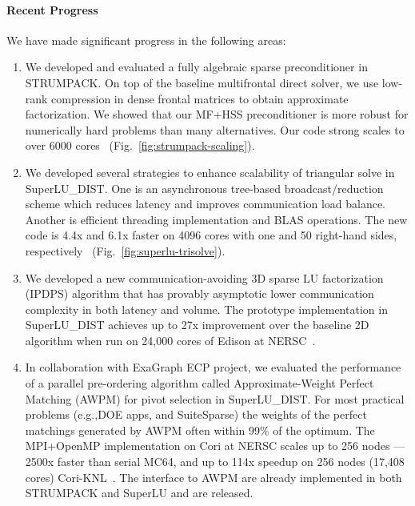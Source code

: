 \paragraph{Recent Progress}
We have made significant progress in the following areas:
\begin{enumerate}
\item We developed and evaluated a fully algebraic sparse preconditioner in 
      STRUMPACK. On top of the baseline multifrontal direct solver, we use
      low-rank compression in dense frontal matrices to obtain approximate
      factorization. We showed that our MF+HSS preconditioner is more robust
      for numerically hard problems than many alternatives. Our code
      strong scales to over 6000 cores~\cite{ghysels2017-ipdps}
      (Fig.~\ref{fig:strumpack-scaling}).
\item We developed several strategies to enhance scalability of triangular
      solve in SuperLU\_DIST. One is an asynchronous tree-based 
      broadcast/reduction scheme which reduces latency and improves
      communication load balance. Another is efficient threading implementation
      and BLAS operations. The new code is 4.4x and 6.1x faster on 4096 cores
      with one and 50 right-hand sides, respectively~\cite{LiuTriSolve2018}
      (Fig.~\ref{fig:superlu-trisolve}).
\item We developed a new communication-avoiding 3D sparse LU factorization
      (IPDPS) algorithm that has provably asymptotic lower communication
      complexity in both latency and volume. The prototype implementation
      in SuperLU\_DIST achieves up to 27x improvement over the baseline 
      2D algorithm when run on 24,000 cores of Edison at
      NERSC~\cite{sao2018}.
\item In collaboration with ExaGraph ECP project, we evaluated the performance
      of a parallel pre-ordering algorithm called Approximate-Weight Perfect
      Matching (AWPM) for pivot selection in SuperLU\_DIST. 
      For most practical problems (e.g.,DOE apps, and SuiteSparse) the 
      weights of the perfect matchings generated by AWPM often within 99\%
      of the optimum. The MPI+OpenMP implementation on Cori at NERSC scales          up to 256 nodes –-- 2500x faster than serial MC64, and up to 114x
      speedup on 256 nodes (17,408 cores) Cori-KNL~\cite{AWPM2018}.
      The interface to AWPM are already implemented in both STRUMPACK and
      SuperLU and are released.
\end{enumerate}
